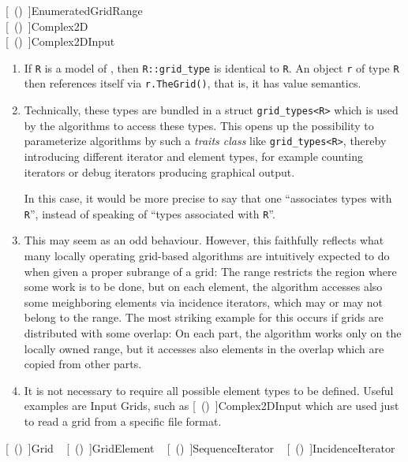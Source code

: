     [~(\Ref)~]{EnumeratedGridRange} ~
    \W\\
    [~(\Ref)~]{Complex2D} ~
    \W\\
    [~(\Ref)~]{Complex2DInput} ~

    \begin{enumerate}
    \item       {}
      If {\tt  R} is a model of
      ,
      then {\tt  R::grid\_type} is identical to {\tt  R}.
      An object {\tt  r} of type {\tt R} 
      then references itself via {\tt  r.TheGrid()}, 
      that is, it has value semantics.
          
      \item   {}
        Technically, these types are bundled in a struct {\tt  grid\_types<R>}
      which is used by the algorithms to access these types. This opens up the possibility
      to parameterize algorithms by such a {\em  traits class} like {\tt  grid\_types<R>},
      thereby introducing different iterator and element types, for example counting iterators
      or debug iterators producing graphical output.
    
      In this case, it would be more precise to say that one 
      ``associates types with {\tt  R}'', 
      instead of speaking of ``types associated with {\tt  R}''.

      
      \item {}
        This may seem as an odd behaviour. However, this faithfully reflects what many
      locally operating grid-based algorithms are intuitively expected to do when
      given a proper subrange of a grid: The range restricts the region where some
      work is to be done, but on each element, the algorithm accesses also some
      meighboring elements via incidence iterators, which may or may not belong to the
      range. The most striking example for this occurs if grids are distributed with
      some overlap: On each part, the algorithm works only on the locally owned range, 
      but it accesses also elements in the overlap which are copied from other parts.

     
      \item 
        It is not necessary to require all possible element types to be defined.
      Useful examples are Input Grids, 
      such as [~(\Ref )~]{Complex2DInput}
      which are used just to read a grid from
      a specific file format.
    \end{enumerate}

    [~(\Ref )~]{Grid} ~
    [~(\Ref )~]{GridElement} ~
    [~(\Ref )~]{SequenceIterator} ~
    [~(\Ref )~]{IncidenceIterator} 


